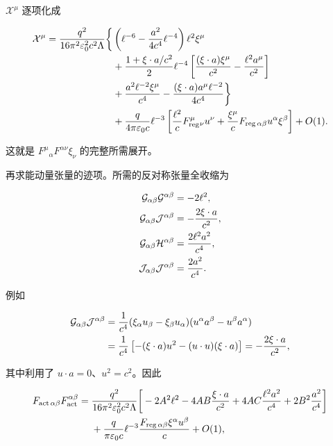 $\mathcal X^\mu$ 逐项化成

\begin{align*}
 \mathcal X^\mu
 ={q^2\over16\pi^2\varepsilon_0^2c^2\Lambda}
 \bigg\{{}
 &\left(\ell^{-6}-{a^2\over4c^4}\ell^{-4}\right)
 \ell^2\xi^\mu\\
 &+{1+\xi\cdot a/c^2\over2}\ell^{-4}
 \left[{(\xi\cdot a)\xi^\mu\over c^2}
 -{\ell^2a^\mu\over c^2}\right]\\
 &+{a^2\ell^{-2}\xi^\mu\over c^4}
 -{(\xi\cdot a)a^\mu\ell^{-2}\over4c^4}
 \bigg\}\\
 &+{q\over4\pi\varepsilon_0c}\ell^{-3}
 \left[
 {\ell^2\over c}F_{\mathrm{reg}}^\mu{}_\nu u^\nu
 +{\xi^\mu\over c}F_{\mathrm{reg}\,\alpha\beta}u^\alpha\xi^\beta
 \right]+O(1).
\end{align*}

这就是 $F^\mu{}_\alpha F^{\alpha\nu}\xi_\nu$ 的完整所需展开。

再求能动量张量的迹项。所需的反对称张量全收缩为

\begin{align*}
 \mathcal G_{\alpha\beta}\mathcal G^{\alpha\beta}
 &=-2\ell^2,\\
 \mathcal G_{\alpha\beta}\mathcal J^{\alpha\beta}
 &=-{2\xi\cdot a\over c^2},\\
 \mathcal G_{\alpha\beta}\mathcal H^{\alpha\beta}
 &={2\ell^2a^2\over c^4},\\
 \mathcal J_{\alpha\beta}\mathcal J^{\alpha\beta}
 &={2a^2\over c^4}.
\end{align*}

例如

\begin{align*}
 \mathcal G_{\alpha\beta}\mathcal J^{\alpha\beta}
 &={1\over c^4}(\xi_\alpha u_\beta-\xi_\beta u_\alpha)
 (u^\alpha a^\beta-u^\beta a^\alpha)\\
 &={1\over c^4}\left[-(\xi\cdot a)u^2-(u\cdot u)(\xi\cdot a)\right]
 =-{2\xi\cdot a\over c^2},
\end{align*}

其中利用了 $u\cdot a=0$、$u^2=c^2$。因此

\begin{align*}
 F_{\mathrm{act}\,\alpha\beta}F_{\mathrm{act}}^{\alpha\beta}
 ={}&{q^2\over16\pi^2\varepsilon_0^2c^2\Lambda}
 \bigg[
 -2A^2\ell^2
 -4AB{\xi\cdot a\over c^2}
 +4AC{\ell^2a^2\over c^4}
 +2B^2{a^2\over c^4}
 \bigg]\\
 &+{q\over\pi\varepsilon_0c}\ell^{-3}
 {F_{\mathrm{reg}\,\alpha\beta}\xi^\alpha u^\beta\over c}
 +O(1),
\end{align*}

